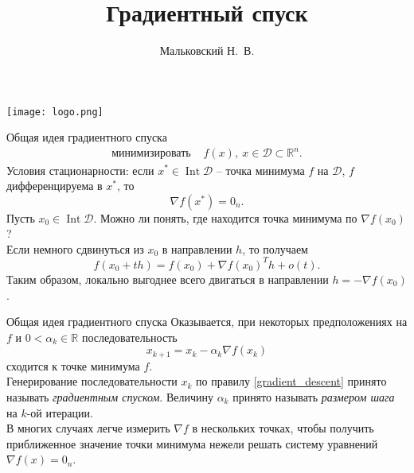 \documentclass[10pt]{beamer}
\author{Мальковский Н.~В.}
\title[Градиентный спуск]{Градиентный спуск}
\institute[СПбAУ]{Санкт-Петербургский академический университет}
\date{}
\DeclareMathOperator{\interior}{Int}
\begin{document}
\begin{frame}
\titlepage
\centering
\texttt{[image: logo.png]}
\end{frame}


\begin{frame}{Общая идея градиентного спуска}
\begin{equation}\label{general_problem}
\begin{array}{ll}
\mbox{минимизировать } & f(x),~x\in \mathcal{D}\subset\mathbb{R}^n.
\end{array}
\end{equation}
Условия стационарности: если $x^*\in \interior\mathcal{D}$ -- точка минимума $f$ на $\mathcal{D}$, $f$ дифференцируема в $x^*$, то 
$$
\nabla f(x^*)=0_n.
$$
\pause
Пусть $x_0\in \interior\mathcal{D}$. Можно ли понять, где находится точка минимума по $\nabla f(x_0)$?\\
\pause
Если немного сдвинуться из $x_0$ в направлении $h$, то получаем
$$
f(x_0+th)=f(x_0)+\nabla f(x_0)^Th+o(t).
$$
Таким образом, локально выгоднее всего двигаться в направлении $h=-\nabla f(x_0)$.\\
\end{frame}

\begin{frame}{Общая идея градиентного спуска}
Оказывается, при некоторых предположениях на $f$ и $0<\alpha_k\in \mathbb{R}$  последовательность 
\begin{equation}\label{gradient_descent}
x_{k+1}=x_k-\alpha_k\nabla f(x_k)
\end{equation}
сходится к точке минимума $f$.\\
\pause
Генерирование последовательности $x_k$ по правилу \eqref{gradient_descent} принято называть \textit{градиентным спуском}. Величину $\alpha_k$ принято называть \textit{размером шага} на $k$-ой итерации.\\
\pause
\vspace{1em}
В многих случаях легче измерить $\nabla f$ в нескольких точках, чтобы получить приближенное значение точки минимума нежели решать систему уравнений $\nabla f(x)=0_n$.
\end{frame}
\end{document}
